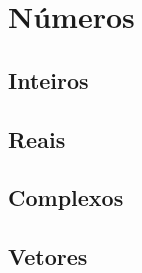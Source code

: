 \chapter[c:numeros]{Números}

    \section*{Inteiros}

    \section*{Reais}

    \section*{Complexos}

    \section*{Vetores}
    
    